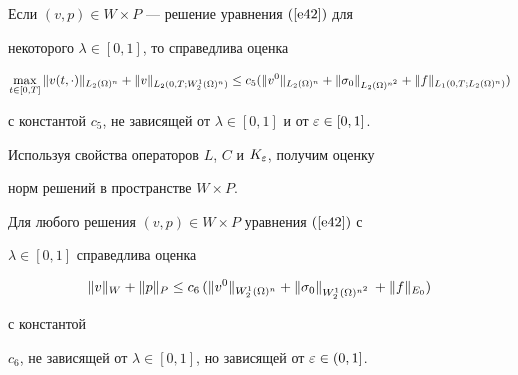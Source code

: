\begin{lems}\label{l41}


Если $(v,p)\in W \times P$ --- решение уравнения $(\ref{e42})$ для


некоторого $\lambda\in [0,1]$, то справедлива оценка


\begin{equation}


\label{e43}


\maxl {t \in [0,T]}\|v(t,\cdot)\|_{L_2(\Om)^n}+


\|v\|_{L_2(0,T;W_2^1(\Om)^n)} \le


c_5(\|v^0\|_{L_2(\Om)^n} +\|\sig_0\|_{L_2(\Om)^{n^2}}+


\|f\|_{L_1(0,T; L_2(\Om)^n)})


\end{equation}


с константой $c_5$, не зависящей от $\lambda\in[0,1]$ и от $\varepsilon\in[0,1]$.


\end{lems}





Используя свойства операторов $L$, $C$ и $K_{\varepsilon}$, получим оценку


норм решений в пространстве $W \times P$.





\begin{thms}\label{t41}


Для любого решения $(v,p)\in W \times P$ уравнения $(\ref{e42})$ с


$\lambda\in [0,1]$ справедлива оценка


\begin{equation}


\label{e44}


\|v\|_W+\|p\|_P \le c_6\,(\|v^0\|_{W^1_2(\Om)^n} +


\|\sig_0\|_{W^1_2(\Om)^{n^2}}\,+\|f\|_{E_0})


\end{equation}


с константой


$c_6$, не зависящей от $\lambda\in [0,1]$, но зависящей от $\eps


\in (0,1]$.


\end{thms}





